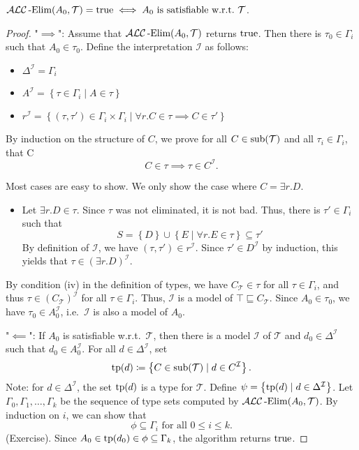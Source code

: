 \begin{lemma}
	$\mathcal{ALC}\operatorname{\text{-Elim}}(A_0, \mathcal{T}) = \mathit{\text{true}} \iff A_0 \text{ is satisfiable w.r.t.\ } \mathcal{T}$.
\end{lemma}
\begin{proof}
	"$ \implies$":
	Assume that $\mathcal{ALC}\operatorname{\text{-Elim}}(A_0, \mathcal{T})$ returns $\mathit{\text{true}}$.
	Then there is $\tau_0 \in \Gamma_i$ such that $A_0 \in \tau_0$.
	Define the interpretation $\mathcal{I}$ as follows:
	\begin{itemize}
		\item $\Delta^\mathcal{I} = \Gamma_i$ 
		\item $A^\mathcal{I} = \left\{ \tau \in \Gamma_i \mid A \in \tau \right\}$
		\item $r^\mathcal{I} = \left\{ (\tau, \tau') \in \Gamma_i \times \Gamma_i \mid \forall r.C \in \tau \implies C \in \tau' \right\}$
	\end{itemize}
	By induction on the structure of $C$, we prove for all $C \in \operatorname{\text{sub}}(\mathcal{T})$ and all $\tau_i \in \Gamma_i$,
	that C 
	\[
		C \in \tau \implies \tau \in C^{\mathcal{I}}
	.\]
	\begin{subproof}
		Most cases are easy to show.
		We only show the case where $C = \exists r.D$.
		\begin{itemize}
			\item Let $\exists r.D \in \tau$.
				Since $\tau$ was not eliminated, it is not bad.
				Thus, there is $\tau' \in \Gamma_i$ such that
				\[
					S = \left\{ D \right\} \cup \left\{ E \mid \forall r.E \in \tau \right\} \subseteq \tau'
				\]
				By definition of $\mathcal{I}$, we have $(\tau, \tau') \in r^\mathcal{I}$.
				Since $\tau' \in D^\mathcal{I}$ by induction, this yields that $\tau \in \left( \exists r.D \right)^\mathcal{I}$.
				\qedhere
		\end{itemize}
	\end{subproof}
	By condition (iv) in the definition of types,
	we have $C_{\mathcal{T}} \in \tau$ for all $\tau \in \Gamma_i$,
	and thus $\tau \in (C_{\mathcal{T}})^\mathcal{I}$ for all $\tau \in \Gamma_i$.
	Thus, $\mathcal{I}$ is a model of $\top \sqsubseteq C_{\mathcal{T}}$.
	Since $A_0 \in \tau_0$, we have $\tau_0 \in A_0^{\mathcal{I}}$,
	i.e.\ $\mathcal{I}$ is also a model of $A_0$.

	"$ \impliedby$":
	If $A_0$ is satisfiable w.r.t.\ $\mathcal{T}$, then there is a model $\mathcal{I}$ of $\mathcal{T}$ 
	and $d_0 \in \Delta^\mathcal{I}$ such that $d_0 \in A_0^\mathcal{I}$.
	For all $d \in \Delta^\mathcal{I}$, set
	\[
		\operatorname{\text{tp}}(d) \coloneqq \left\{ C \in \operatorname{\text{sub}}(\mathcal{T}) \mid d \in C^\mathcal{I} \right\}
	.\]
	Note: for $d \in \Delta^\mathcal{I}$, the set $\operatorname{\text{tp}}(d)$ is a type for $\mathcal{T}$.
	Define $\psi = \left\{ \operatorname{\text{tp}}(d) \mid d \in \Delta^\mathcal{I} \right\}$.
	Let $\Gamma_0, \Gamma_1, \ldots, \Gamma_k$ be the sequence of type sets
	computed by $\mathcal{ALC}\operatorname{\text{-Elim}}(A_0, \mathcal{T})$.
	By induction on $i$, we can show that
	 \[
	\phi \subseteq \Gamma_i \text{ for all } 0 \leq i \leq k
	.\]
	(Exercise).
	Since $A_0 \in \operatorname{\text{tp}}(d_0) \in \phi \subseteq \Gamma_k$,
	the algorithm returns $\mathit{\text{true}}$.

\end{proof}

